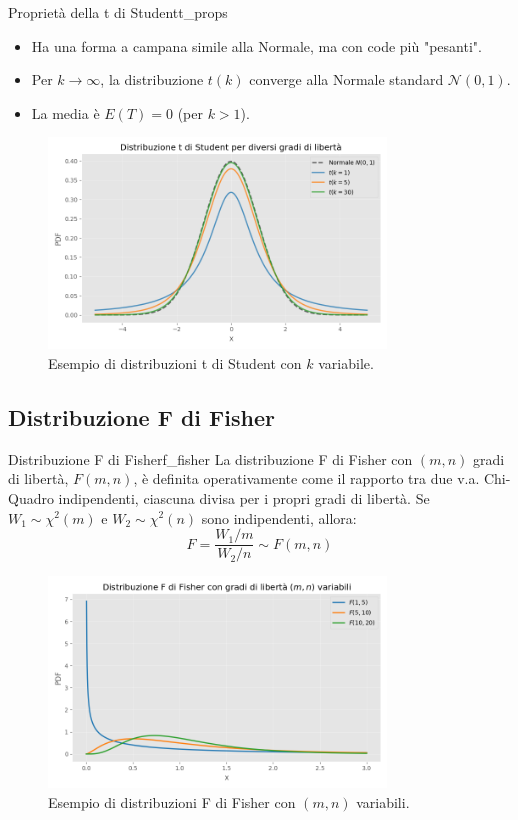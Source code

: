\begin{proposizione}{Proprietà della t di Student}{t_props}
\begin{itemize}
    \item Ha una forma a campana simile alla Normale, ma con code più "pesanti".
    \item Per \(k \to \infty\), la distribuzione \(t(k)\) converge alla Normale standard \(\mathcal{N}(0,1)\).
    \item La media è \(E(T)=0\) (per \(k>1\)).
\end{itemize}
\end{proposizione}

\begin{figure}[H]
    \centering
    \includegraphics[width=0.8\textwidth]{images/t_student.png}
    \caption{Esempio di distribuzioni t di Student con \(k\) variabile.}
    \label{fig:t_student}
\end{figure}

\subsection{Distribuzione F di Fisher}

\begin{definizione}{Distribuzione F di Fisher}{f_fisher}
La distribuzione F di Fisher con \((m, n)\) gradi di libertà, \(F(m,n)\), è definita operativamente come il rapporto tra due v.a. Chi-Quadro indipendenti, ciascuna divisa per i propri gradi di libertà.
Se \(W_1 \sim \chi^2(m)\) e \(W_2 \sim \chi^2(n)\) sono indipendenti, allora:
\[
F = \frac{W_1/m}{W_2/n} \sim F(m,n) \text{}
\]
\end{definizione}

\begin{figure}[H]
    \centering
    \includegraphics[width=0.8\textwidth]{images/f_fisher.png}
    \caption{Esempio di distribuzioni F di Fisher con \((m,n)\) variabili.}
    \label{fig:f_fisher}
\end{figure}

